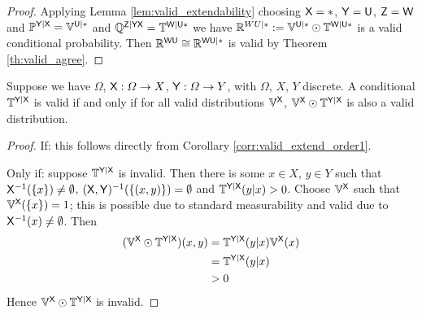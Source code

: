 \begin{proof}
Applying Lemma \ref{lem:valid_extendability} choosing $\mathsf{X}=*$, $\mathsf{Y}=\mathsf{U}$, $\mathsf{Z}=\mathsf{W}$ and $\mathbb{P}^{\mathsf{Y}|\mathsf{X}}=\mathbb{V}^{\mathsf{U}|*}$ and $\mathbb{Q}^{\mathsf{Z}|\mathsf{YX}}=\mathbb{T}^{\mathsf{W}|\mathsf{U*}}$ we have $\mathbb{R}^{WU|*}:=\mathbb{V}^{\mathsf{U}|*}\odot \mathbb{T}^{\mathsf{W}|\mathsf{U}*}$ is a valid conditional probability. Then $\mathbb{R}^{\mathsf{WU}}\cong \mathbb{R}^{\mathsf{WU}|*}$ is valid by Theorem \ref{th:valid_agree}.
\end{proof}

\begin{theorem}\label{th:valid_conditional_probability}
Suppose we have $\Omega$, $\mathsf{X}:\Omega\to X$, $\mathsf{Y}:\Omega\to Y$, with $\Omega$, $X$, $Y$ discrete. A conditional $\mathbb{T}^{\mathsf{Y}|\mathsf{X}}$ is valid if and only if for all valid distributions $\mathbb{V}^{\mathsf{X}}$, $\mathbb{V}^{\mathsf{X}}\odot \mathbb{T}^{\mathsf{Y}|\mathsf{X}}$ is also a valid distribution.
\end{theorem}

\begin{proof}
If: this follows directly from Corollary \ref{corr:valid_extend_order1}.

Only if: suppose $\mathbb{T}^{\mathsf{Y}|\mathsf{X}}$ is invalid. Then there is some $x\in X$, $y\in Y$ such that $\mathsf{X}^{-1}(\{x\})\neq \emptyset$, $(\mathsf{X},\mathsf{Y})^{-1}(\{(x,y)\})=\emptyset$ and $\mathbb{T}^{\mathsf{Y}|\mathsf{X}}(y|x)>0$. Choose $\mathbb{V}^{\mathsf{X}}$ such that $\mathbb{V}^{\mathsf{X}}(\{x\})=1$; this is possible due to standard measurability and valid due to $\mathsf{X}^{-1}(x)\neq \emptyset$. Then
\begin{align}
    (\mathbb{V}^{\mathsf{X}}\odot \mathbb{T}^{\mathsf{Y}|\mathsf{X}})(x,y) &= \mathbb{T}^{\mathsf{Y}|\mathsf{X}}(y|x) \mathbb{V}^{\mathsf{X}}(x)\\
                                                                     &= \mathbb{T}^{\mathsf{Y}|\mathsf{X}}(y|x)\\
                                                                     &>0
\end{align}
Hence $\mathbb{V}^{\mathsf{X}}\odot \mathbb{T}^{\mathsf{Y}|\mathsf{X}}$ is invalid.
\end{proof}


